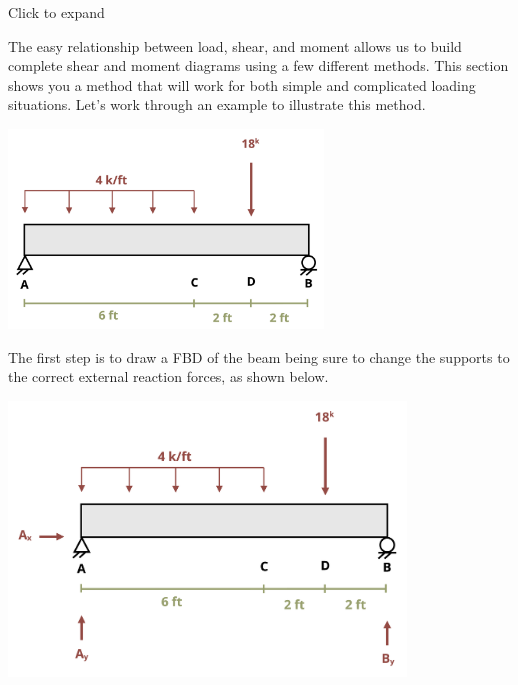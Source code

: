 \documentclass[
  letterpaper,
  DIV=11,
  numbers=noendperiod]{scrreprt}
\begin{document}
Click to expand

The easy relationship between load, shear, and moment allows us to build
complete shear and moment diagrams using a few different methods. This
section shows you a method that will work for both simple and
complicated loading situations. Let's work through an example to
illustrate this method.

\begin{tcolorbox}[enhanced jigsaw, colback=white, colframe=quarto-callout-note-color-frame, leftrule=.75mm, opacitybacktitle=0.6, colbacktitle=quarto-callout-note-color!10!white, arc=.35mm, bottomrule=.15mm, breakable, title={Example 7.2}, left=2mm, titlerule=0mm, toptitle=1mm, toprule=.15mm, opacityback=0, rightrule=.15mm, coltitle=black, bottomtitle=1mm]

\begin{center}
\includegraphics[width=3.29167in,height=\textheight]{images/CH7 PNGs/example 7.2 part 1.png}
\end{center}

The first step is to draw a FBD of the beam being sure to change the
supports to the correct external reaction forces, as shown below.

\begin{center}
\includegraphics[width=4.15625in,height=\textheight]{images/CH7 PNGs/example 7.2 part 2.png}
\end{center}


\end{tcolorbox}
\end{document}
